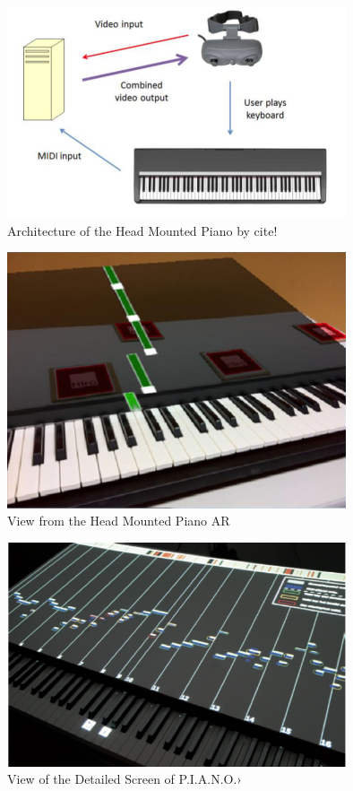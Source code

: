 \documentclass[manuscript,screen]{acmart}
\begin{document}
\begin{figure}
    \centering
    \includegraphics[width=10cm]{figures/headmountedpiano1.png}
    \caption{Architecture of the Head Mounted Piano by cite! }
    \label{fig:pianoheadmountedarch}
\end{figure}

\begin{figure}
    \centering
    \includegraphics[width=10cm]{figures/headmountedview.png}
    \caption{View from the Head Mounted Piano AR  }
    \label{fig:View from the HeadMounted}
\end{figure}

\begin{figure}
    \centering
    \includegraphics[width=10cm]{figures/piano}
    \caption{View of the Detailed Screen of P.I.A.N.O.› }
    \label{fig:View from the HeadMounted}
\end{figure}











\end{document}
